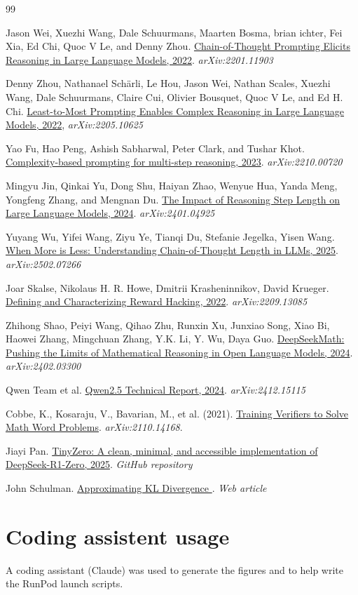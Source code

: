 \documentclass{article}
\begin{document}
\begin{thebibliography}{99}

Jason Wei, Xuezhi Wang, Dale Schuurmans, Maarten Bosma, brian ichter, Fei Xia, Ed Chi,
Quoc V Le, and Denny Zhou. \href{https://arxiv.org/pdf/2201.11903}{Chain-of-Thought Prompting Elicits Reasoning in Large Language Models, 2022}. \textit{arXiv:2201.11903}

 Denny Zhou, Nathanael Schärli, Le Hou, Jason Wei, Nathan Scales, Xuezhi Wang, Dale Schuurmans, Claire Cui, Olivier Bousquet, Quoc V Le, and Ed H. Chi. \href{https://arxiv.org/pdf/2205.10625}{Least-to-Most Prompting Enables Complex Reasoning in Large Language Models, 2022}, \textit{arXiv:2205.10625}

Yao Fu, Hao Peng, Ashish Sabharwal, Peter Clark, and Tushar Khot. \href{https://arxiv.org/pdf/2210.00720}{Complexity-based prompting for multi-step reasoning, 2023}. \textit{arXiv:2210.00720}

Mingyu Jin, Qinkai Yu, Dong Shu, Haiyan Zhao, Wenyue Hua, Yanda Meng, Yongfeng Zhang, and Mengnan Du. \href{https://arxiv.org/pdf/2401.04925}{The Impact of Reasoning Step Length on Large Language Models, 2024}. \textit{arXiv:2401.04925}

Yuyang Wu, Yifei Wang, Ziyu Ye, Tianqi Du, Stefanie Jegelka, Yisen Wang. \href{https://arxiv.org/pdf/2502.07266}{When More is Less: Understanding Chain-of-Thought Length in LLMs, 2025}. \textit{arXiv:2502.07266}

Joar Skalse, Nikolaus H. R. Howe, Dmitrii Krasheninnikov, David Krueger. \href{https://arxiv.org/pdf/2209.13085}{Defining and Characterizing Reward Hacking, 2022}. \textit{arXiv:2209.13085}

Zhihong Shao, Peiyi Wang, Qihao Zhu, Runxin Xu, Junxiao Song, Xiao Bi, Haowei Zhang, Mingchuan Zhang, Y.K. Li, Y. Wu, Daya Guo. \href{https://arxiv.org/pdf/2402.03300}{DeepSeekMath: Pushing the Limits of Mathematical
Reasoning in Open Language Models, 2024}. \textit{arXiv:2402.03300}

Qwen Team et al. \href{https://arxiv.org/pdf/2412.15115}{Qwen2.5 Technical Report, 2024}. \textit{arXiv:2412.15115}

Cobbe, K., Kosaraju, V., Bavarian, M., et al. (2021). \href{https://arxiv.org/abs/2110.14168}{Training Verifiers to Solve Math Word Problems}. \textit{arXiv:2110.14168}.

Jiayi Pan. \href{https://github.com/jiayipan/TinyZero}{TinyZero: A clean, minimal, and accessible implementation of DeepSeek-R1-Zero, 2025}. \textit{GitHub repository}

John Schulman. \href{http://joschu.net/blog/kl-approx.html}{Approximating KL Divergence
}. \textit{Web article}
\end{thebibliography}

\section*{Coding assistent usage}
A coding assistant (Claude) was used to generate the figures and to help write the RunPod launch scripts.
\end{document}
